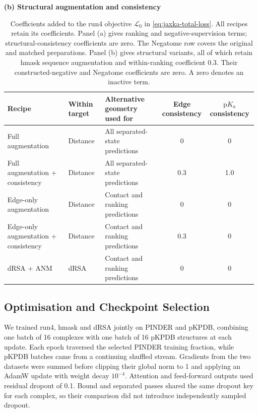 \begin{table}[p]
    \bigskip
    \textbf{(b) Structural augmentation and consistency}\par\medskip
    \begin{tabularx}{\textwidth}{@{}>{\raggedright\arraybackslash}p{4.1cm}>{\raggedright\arraybackslash}p{1.5cm}>{\raggedright\arraybackslash}Xcc@{}}
        \toprule
        Recipe & Within target & Alternative geometry used for & \shortstack{Edge\\consistency} & \shortstack{$\mathrm{p}K_a$\\consistency} \\
        \midrule
        Full augmentation & Distance & All separated-state predictions & 0 & 0 \\
        Full augmentation + consistency & Distance & All separated-state predictions & 0.3 & 1.0 \\
        Edge-only augmentation & Distance & Contact and ranking predictions & 0 & 0 \\
        Edge-only augmentation + consistency & Distance & Contact and ranking predictions & 0.3 & 0 \\
        dRSA + ANM & dRSA & Contact and ranking predictions & 0 & 0 \\
        \bottomrule
    \end{tabularx}
    \caption{Coefficients added to the run4 objective $\mathcal L_0$ in \cref{eq:jaxka-total-loss}. All recipes retain its coefficients. Panel (a) gives ranking and negative-supervision terms; structural-consistency coefficients are zero. The Negatome row covers the original and matched preparations. Panel (b) gives structural variants, all of which retain hmask sequence augmentation and within-ranking coefficient 0.3. Their constructed-negative and Negatome coefficients are zero. A zero denotes an inactive term.}
    \label{tab:jaxka-recipe-coefficients}
\end{table}

\subsection{Optimisation and Checkpoint Selection}
\label{app:jaxka-optimisation}

We trained run4, hmask and dRSA jointly on PINDER and pKPDB, combining one batch of 16 complexes with one batch of 16 pKPDB structures at each update. Each epoch traversed the selected PINDER training fraction, while pKPDB batches came from a continuing shuffled stream. Gradients from the two datasets were summed before clipping their global norm to 1 and applying an AdamW update with weight decay $10^{-4}$. Attention and feed-forward outputs used residual dropout of 0.1. Bound and separated passes shared the same dropout key for each complex, so their comparison did not introduce independently sampled dropout.

